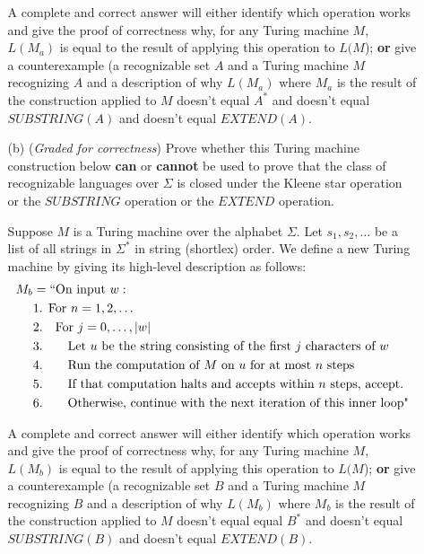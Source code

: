 \documentclass[12pt, oneside]{article}
\newcommand{\gradeCorrect}{({\it Graded for correctness}) }
\begin{document}
\begin{enumerate}[wide, labelwidth=!, labelindent=0pt]
\begin{enumerate}
A complete and correct answer will either identify which operation works and give the proof of correctness why, for any Turing machine $M$, $L(M_{a})$ is equal to the result of applying this operation to $L(M$); {\bf or} give a counterexample (a recognizable set $A$ and a Turing machine $M$ recognizing $A$
and a description of why $L(M_a)$ where $M_a$ is the result of the construction 
applied to $M$ doesn't equal $A^*$ and doesn't equal $SUBSTRING(A)$ and doesn't equal $EXTEND(A)$.

\item[(b)]\gradeCorrect Prove whether this Turing machine construction below 
{\bf can} or {\bf cannot} be used to prove that the
class of recognizable languages over $\Sigma$ is closed under the 
Kleene star operation or the $SUBSTRING$ operation or the $EXTEND$ operation.

Suppose $M$ is a Turing machine over the alphabet $\Sigma$. 
Let $s_1, s_2, \ldots$ be a list of all strings in 
$\Sigma^*$ in string (shortlex) order.
We define a new Turing machine
by giving its high-level description as follows: 
\begin{align*}
    M_{b} &= ``\text{On input }w:\\
     &\text{1. For $n = 1, 2, \ldots$}\\
     &\text{2.~~~For $j = 0, \ldots, |w|$} \\
     &\text{3.~~~~~~Let $u$ be the string consisting of the first $j$ characters of $w$} \\
     &\text{4.~~~~~~Run the computation of $M$ on $u$ for at most $n$ steps}\\
     &\text{5.~~~~~~If that computation halts and accepts within $n$ steps, accept.}\\
     &\text{6.~~~~~~Otherwise, continue with the next iteration of this inner loop"}\\
 \end{align*}

A complete and correct answer will either identify which operation works and give the proof of correctness why, for any Turing machine $M$, $L(M_{b})$ is equal to the result of applying this operation to $L(M$); {\bf or} give a counterexample (a recognizable set $B$ and a Turing machine $M$ recognizing $B$
and a description of why $L(M_b)$ where $M_b$ is the result of the construction 
applied to $M$ doesn't equal equal $B^*$ and doesn't equal $SUBSTRING(B)$ and doesn't equal $EXTEND(B)$.
\end{enumerate}


\end{enumerate}
\end{document}
